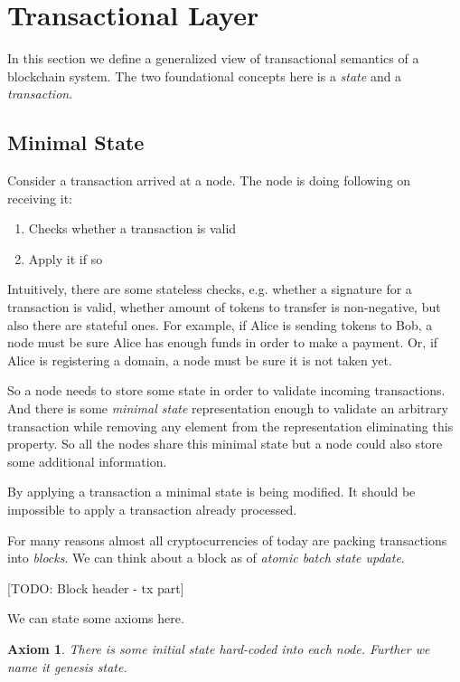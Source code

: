 \documentclass[]{report}   %
\newtheorem{axiom}{Axiom}
\begin{document}
\section{Transactional Layer}

In this section we define a generalized view of transactional semantics of a blockchain system. The two foundational concepts here is a \textit{state} and a \textit{transaction}.

\subsection{Minimal State}     %
	Consider a transaction arrived at a node. The node is doing following on receiving it:

    \begin{enumerate}
		\item Checks whether a transaction is valid
		\item Apply it if so
    \end{enumerate}

	Intuitively, there are some stateless checks, e.g. whether a signature for a transaction is valid, whether amount of tokens to transfer is non-negative, but also there are stateful ones. For example, if Alice is sending tokens to Bob, a node must be sure Alice has enough funds in order to make a payment. Or, if Alice is registering a domain, a node must be sure it is not taken yet. 

	So a node needs to store some state in order to validate incoming transactions. And there is some \textit{minimal state} representation enough to validate an arbitrary transaction while removing any element from the representation eliminating this property. So all the nodes share this minimal state but a node could also store some additional information. 

	By applying a transaction a minimal state is being modified. It should be impossible to apply a transaction already processed. 

	For many reasons almost all cryptocurrencies of today are packing transactions into \textit{blocks}. We can think about a block as of \textit{atomic batch state update}. 

    [TODO: Block header - tx part]


	We can state some axioms here.

	\begin{axiom}
	 There is some initial state hard-coded into each node. Further we name it \textit{genesis state}.
	\end{axiom}
\end{document}

